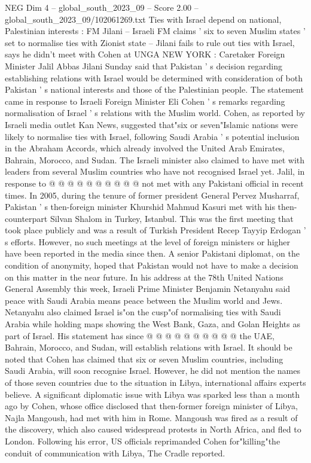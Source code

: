 \begin{textsample}{NEG Dim 4 – global\_south\_2023\_09 – Score 2.00 – global\_south\_2023\_09/102061269.txt}  \label{ex:f4_neg_023}
Ties with Israel depend on national, Palestinian interests : FM Jilani -- Israeli FM claims ' six to seven Muslim states ' set to normalise ties with Zionist state -- Jilani fails to rule out ties with Israel, says he didn't meet with Cohen at UNGA NEW YORK : Caretaker Foreign Minister Jalil Abbas Jilani Sunday said that Pakistan ' s decision regarding establishing relations with Israel would be determined with consideration of both Pakistan ' s national interests and those of the Palestinian people.
The statement came in response to Israeli Foreign Minister Eli Cohen ' s remarks regarding normalisation of Israel ' s relations with the Muslim world.
Cohen, as reported by Israeli media outlet Kan News, suggested that"six or seven"Islamic nations were likely to normalise ties with Israel, following Saudi Arabia ' s potential inclusion in the Abraham Accords, which already involved the United Arab Emirates, Bahrain, Morocco, and Sudan.
The Israeli minister also claimed to have met with leaders from several Muslim countries who have not recognised Israel yet.
Jalil, in response to @ @ @ @ @ @ @ @ @ @ not met with any Pakistani official in recent times.
In 2005, during the tenure of former president General Pervez Musharraf, Pakistan ' s then-foreign minister Khurshid Mahmud Kasuri met with his then-counterpart Silvan Shalom in Turkey, Istanbul.
This was the first meeting that took place publicly and was a result of Turkish President Recep Tayyip Erdogan ' s efforts.
However, no such meetings at the level of foreign ministers or higher have been reported in the media since then.
A senior Pakistani diplomat, on the condition of anonymity, hoped that Pakistan would not have to make a decision on this matter in the near future.
In his address at the 78th United Nations General Assembly this week, Israeli Prime Minister Benjamin Netanyahu said peace with Saudi Arabia means peace between the Muslim world and Jews.
Netanyahu also claimed Israel is"on the cusp"of normalising ties with Saudi Arabia while holding maps showing the West Bank, Gaza, and Golan Heights as part of Israel.
His statement has since @ @ @ @ @ @ @ @ @ @ the UAE, Bahrain, Morocco, and Sudan, will establish relations with Israel.
It should be noted that Cohen has claimed that six or seven Muslim countries, including Saudi Arabia, will soon recognise Israel.
However, he did not mention the names of those seven countries due to the situation in Libya, international affairs experts believe.
A significant diplomatic issue with Libya was sparked less than a month ago by Cohen, whose office disclosed that then-former foreign minister of Libya, Najla Mangoush, had met with him in Rome.
Mangoush was fired as a result of the discovery, which also caused widespread protests in North Africa, and fled to London.
Following his error, US officials reprimanded Cohen for"killing"the conduit of communication with Libya, The Cradle reported.

\end{textsample}
